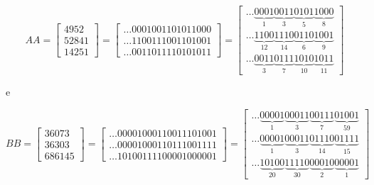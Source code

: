 \documentclass[12pt]{article}
\begin{document}
\begin{equation}\label{eq:01}
	AA = \begin{bmatrix}
			4952\\ 
			52841\\ 
			14251
		\end{bmatrix} 
        =
        \begin{bmatrix}
			\ldots0001001101011000\\ 
			\ldots1100111001101001\\ 
			\ldots0011011110101011
		\end{bmatrix}
        =
        \begin{bmatrix}
\ldots\underbrace{0001}_{1}\underbrace{0011}_{3}\underbrace{0101}_{5}\underbrace
{1000}_{8}\\
\ldots\underbrace{1100}_{12}\underbrace{1110}_{14}\underbrace{0110}_{6}
\underbrace{1001}_{9}\\ 
\ldots\underbrace{0011}_{3}\underbrace{0111}_{7}\underbrace{1010}_{10}
\underbrace{1011}_{11}
		\end{bmatrix}
\end{equation}

e

\begin{equation}\label{eq:02}
	BB = \begin{bmatrix}
			36073\\ 
			36303\\ 
			686145
		\end{bmatrix}
        =
         \begin{bmatrix}
			\ldots00001000110011101001\\ 
			\ldots00001000110111001111\\ 
			\ldots10100111100001000001
		\end{bmatrix}
        =
        \begin{bmatrix}

\ldots\underbrace{00001}_{1}\underbrace{00011}_{3}\underbrace{00111}_{7}
\underbrace{01001}_{59}\\
\ldots\underbrace{00001}_{1}\underbrace{00011}_{3}\underbrace{01110}_{14}
\underbrace{01111}_{15}\\
\ldots\underbrace{10100}_{20}\underbrace{11110}_{30}\underbrace{00010}_{2}
\underbrace{00001}_{1}
		\end{bmatrix}
\end{equation}
\end{document}
